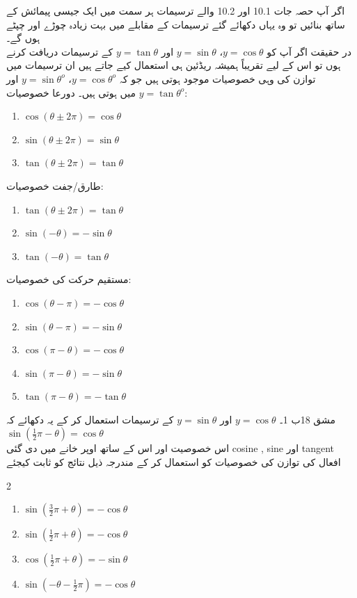 اگر آپ حصہ جات 10.1 اور 10.2 والے ترسیمات ہر سمت میں ایک جیسی پیمائش کے ساتھ بنائیں تو وہ یہاں دکھائے گئے ترسیمات کے مقابلے میں بہت زیادہ چوڑے اور چپٹے ہوں گے۔\\ 
در حقیقت اگر آپ کو 
\(y=\cos\theta\)،
\(y=\sin\theta\)
اور
\(y=\tan\theta\) 
کے ترسیمات دریافت کرنے ہوں تو اس کے لیے تقریباً ہمیشہ ریڈئین ہی استعمال کیے جاتے ہیں
ان ترسیمات میں توازن کی وہی خصوصیات موجود ہوتی ہیں جو کہ
\(y=\cos\theta^o\)،
\(y=\sin\theta^o\)
اور
\(y=\tan\theta^o\)
میں ہوتی ہیں۔
دورعا خصوصیات: 
\begin{enumerate}
\item
\(\cos(\theta\pm2\pi)=\cos\theta\)
\item
\(\sin(\theta\pm2\pi)=\sin\theta\)
\item
\(\tan(\theta\pm2\pi)=\tan\theta\)\\
\end{enumerate}
طارق/جفت خصوصیات: 
\begin{enumerate}
\item
\(\tan(\theta\pm2\pi)=\tan\theta\)
\item
\(\sin(-\theta)=-\sin\theta\)
\item
\(\tan(-\theta)=\tan\theta\)\\
\end{enumerate}
مستقیم حرکت کی خصوصیات:
\begin{enumerate}
\item
\(\cos(\theta-\pi)=-\cos\theta\)
\item
\(\sin(\theta-\pi)=-\sin\theta\)
\item
\(\cos(\pi-\theta)=-\cos\theta\)
\item
\(\sin(\pi-\theta)=-\sin\theta\)
\item
\(\tan(\pi-\theta)=-\tan\theta\)\\
\end{enumerate}
مشق 18ب 
1۔ 
\(y=\cos\theta\)
اور
\(y=\sin\theta\)
کے ترسیمات استعمال کر کے یہ دکھائے کہ 
\(\sin(\frac{1}{2}\pi-\theta)=\cos\theta\)\\
اس خصوصیت اور اس کے ساتھ اوپر خانے میں دی گئی cosine , sine اور tangent افعال کی توازن کی خصوصیات کو استعمال کر کے مندرجہ ذیل نتائج کو ثابت کیجئے
\begin{multicols}{2}
\begin{enumerate}[a]
\item\(\sin(\frac{3}{2}\pi+\theta)=-\cos\theta\)
\item\(\sin(\frac{1}{2}\pi+\theta)=-\cos\theta\)
\item\(\cos(\frac{1}{2}\pi+\theta)=-\sin\theta\)
\item\(\sin(-\theta-\frac{1}{2}\pi)=-\cos\theta\)
\end{enumerate}
\end{multicols}
